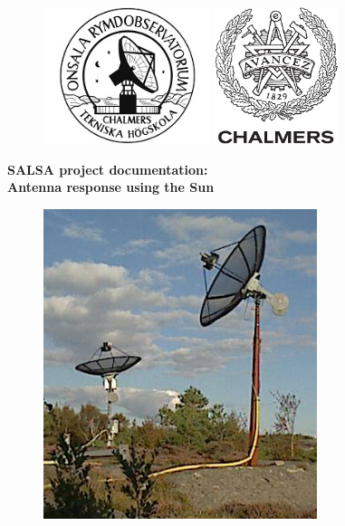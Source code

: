 \begin{titlepage}

\begin{figure}[t]
\vspace{-2cm}
\centering
\includegraphics[height=4cm]{../figures/OSO-logo.jpg}
\hspace{4cm}
\includegraphics[height=4cm]{../figures/CHALMERS-logo.pdf}
\vspace{1cm}
\end{figure}

\begin{center}
\Huge \textbf{
SALSA project documentation: 		\\
\bigskip
Antenna response using the Sun
}
\end{center}

\begin{figure}[!h]
\centering
\includegraphics[width=8cm]{../figures/SALSA.png}
\end{figure}



\end{titlepage}
